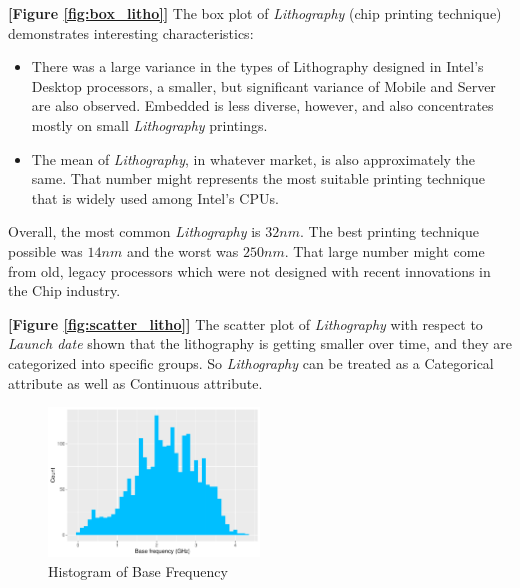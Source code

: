 

\textbf{[Figure \ref{fig:box_litho}]} The box plot of \textit{Lithography} (chip printing technique) demonstrates interesting characteristics:
\begin{itemize}
    \item There was a large variance in the types of Lithography designed in Intel's Desktop processors, a smaller, but significant variance of 
    Mobile and Server are also observed. Embedded is less diverse, however, and also concentrates mostly on small \textit{Lithography} printings.

    \item The mean of \textit{Lithography}, in whatever market, is also approximately the same. That number might represents the most suitable 
    printing technique that is widely used among Intel's CPUs.
\end{itemize}

Overall, the most common \textit{Lithography} is $32 nm$. The best printing technique possible was $14 nm$ and the worst was $250 nm$. That large
number might come from old, legacy processors which were not designed with recent innovations in the Chip industry.

\textbf{[Figure \ref{fig:scatter_litho}]} The scatter plot of \textit{Lithography} with respect to \textit{Launch date} shown that the lithography
is getting smaller over time, and they are categorized into specific groups. So \textit{Lithography} can be treated as a Categorical attribute as well
as Continuous attribute.







\begin{figure}[H]
    \centering
    \includegraphics[width=0.5\textwidth]{./graphics/hist_bfreq.pdf}
    \caption{Histogram of Base Frequency}
    \label{fig:hist_bfreq}
\end{figure}

